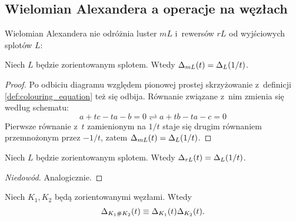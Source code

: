 
\subsection{Wielomian Alexandera a operacje na węzłach}
Wielomian Alexandera nie odróżnia luster $mL$ i~rewersów $rL$ od wyjściowych splotów $L$:

\begin{proposition}
%
    Niech $L$ będzie zorientowanym splotem.
    Wtedy $\Delta_{mL}(t) = \Delta_L(1/t)$.
\end{proposition}

\begin{proof}
    Po odbiciu diagramu względem pionowej prostej skrzyżowanie z~definicji \ref{def:colouring_equation} też się odbija.
    Równanie związane z~nim zmienia się według schematu:
    \begin{equation}
        a + tc - ta - b = 0 \rightleftharpoons a + tb - ta - c = 0
    \end{equation}
    Pierwsze równanie z~$t$ zamienionym na $1/t$ staje się drugim równaniem przemnożonym przez $-1/t$, zatem $\Delta_{mL}(t) = \Delta_L(1/t)$.
\end{proof}

\begin{proposition}
%
    Niech $L$ będzie zorientowanym splotem.
    Wtedy $\Delta_{rL}(t) = \Delta_L(1/t)$.
\end{proposition}

\begin{proof}[Niedowód]
    Analogicznie.
\end{proof}

\begin{proposition}
\label{prp:alexander_multiplicative}%
    Niech $K_1, K_2$ będą zorientowanymi węzłami.
    Wtedy
    \begin{equation}
        \Delta_{K_1 \mathbin{\#} K_2}(t) \equiv \Delta_{K_1}(t) \Delta_{K_2}(t).
    \end{equation}
\end{proposition}

